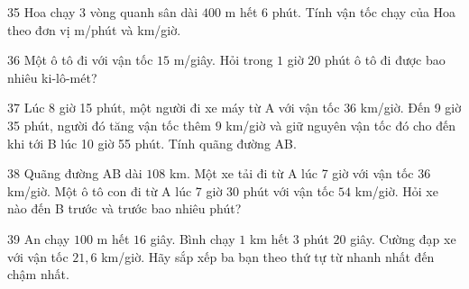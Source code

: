 \gap
\begin{probbox}{35}{}
Hoa chạy $3$ vòng quanh sân dài $400$ m hết $6$ phút. Tính vận tốc chạy của Hoa theo đơn vị m/phút và km/giờ.
\end{probbox}
\gap
\begin{probbox}{36}{}
Một ô tô đi với vận tốc $15$ m/giây. Hỏi trong $1$ giờ $20$ phút ô tô đi được bao nhiêu ki-lô-mét?
\end{probbox}
\gap
\begin{probbox}{37}{}
Lúc 8 giờ 15 phút, một người đi xe máy từ A với vận tốc $36$ km/giờ. Đến 9 giờ 35 phút, người đó tăng vận tốc thêm $9$ km/giờ và giữ nguyên vận tốc đó cho đến khi tới B lúc 10 giờ 55 phút. Tính quãng đường AB.
\end{probbox}
\gap
\begin{probbox}{38}{}
Quãng đường AB dài $108$ km. Một xe tải đi từ A lúc 7 giờ với vận tốc $36$ km/giờ. Một ô tô con đi từ A lúc 7 giờ 30 phút với vận tốc $54$ km/giờ. Hỏi xe nào đến B trước và trước bao nhiêu phút?
\end{probbox}
\gap
\begin{probbox}{39}{}
An chạy $100$ m hết $16$ giây. Bình chạy $1$ km hết $3$ phút $20$ giây. Cường đạp xe với vận tốc $21{,}6$ km/giờ. Hãy sắp xếp ba bạn theo thứ tự từ nhanh nhất đến chậm nhất.
\end{probbox}
